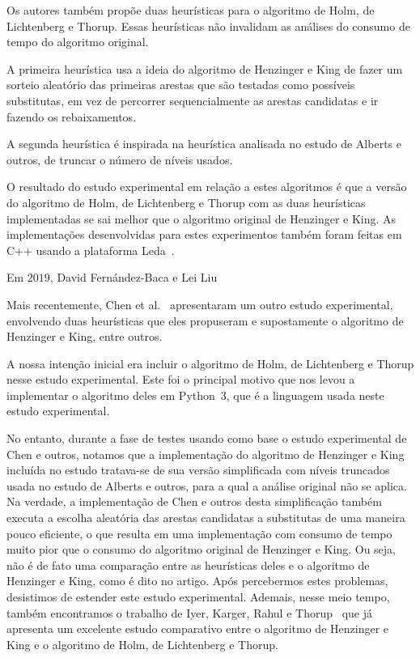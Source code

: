 Os autores também propõe duas heurísticas para o algoritmo de Holm, de Lichtenberg e Thorup. Essas heurísticas não invalidam as análises do consumo de tempo do algoritmo original.

A primeira heurística usa a ideia do algoritmo de Henzinger e King de fazer um sorteio aleatório das primeiras arestas que são testadas como possíveis substitutas, em vez de percorrer sequencialmente as arestas candidatas e ir fazendo os rebaixamentos.

A segunda heurística é inspirada na heurística analisada no estudo de Alberts e outros, de truncar o número de níveis usados.

O resultado do estudo experimental em relação a estes algoritmos é que a versão do algoritmo de Holm, de Lichtenberg e Thorup com as duas heurísticas implementadas se sai melhor que o algoritmo original de Henzinger e King.
As implementações desenvolvidas para estes experimentos também foram feitas em C++ usando a plataforma Leda~\cite{LEDA}.


Em $2019$, David Fernández-Baca e Lei Liu~\cite{xp-Phylogeny}


Mais recentemente, Chen et al.~\cite{QC22} apresentaram um outro estudo experimental, envolvendo duas heurísticas que eles propuseram e supostamente o algoritmo de Henzinger e King, entre outros.

A nossa intenção inicial era incluir o algoritmo de Holm, de Lichtenberg e Thorup nesse estudo experimental. Este foi o principal motivo que nos levou a implementar o algoritmo deles em Python~3, que é a linguagem usada neste estudo experimental.

No entanto, durante a fase de testes usando como base o estudo experimental de Chen e outros, notamos que a implementação do algoritmo de Henzinger e King incluída no estudo tratava-se de sua versão simplificada com níveis truncados usada no estudo de Alberts e outros, para a qual a análise original não se aplica.
Na verdade, a implementação de Chen e outros desta simplificação também executa a escolha aleatória das arestas candidatas a substitutas de uma maneira pouco eficiente, o que resulta em uma implementação com consumo de tempo muito pior que o consumo do algoritmo original de Henzinger e King.
Ou seja, não é de fato uma comparação entre as heurísticas deles e o algoritmo de Henzinger e King, como é dito no artigo.
Após percebermos estes problemas, desistimos de estender este estudo experimental.
Ademais, nesse meio tempo, também encontramos o trabalho de Iyer, Karger, Rahul e Thorup~\cite{EmpiricalStudy2002} que já apresenta um excelente estudo comparativo entre o algoritmo de Henzinger e King e o algoritmo de Holm, de Lichtenberg e Thorup. 
\begin{comment}
\section{Trabalhos futuros}

Um estudo experimental com boas praticas como~\cite{guideXP1999}
\end{comment}
